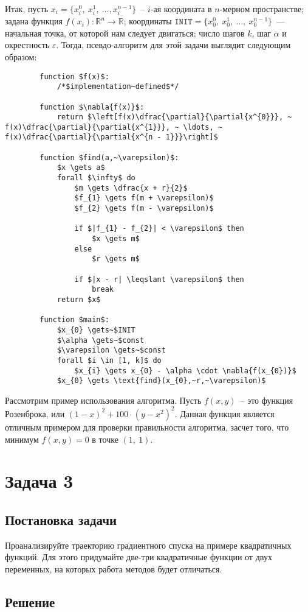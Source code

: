 \documentclass[12pt, a4paper, oneside]{article}
\begin{document}
	Итак, пусть $x_{i} = \{x^{0}_{i}, ~ x^{1}_{i}, ~ \ldots, x^{n - 1}_{i}\}$~-- $i$-ая координата в $n$-мерном пространстве; задана функция $f(x_{i}) : \mathbb{R}^{n} \to \mathbb{R}$; координаты $\texttt{INIT} = \{x^{0}_{0}, ~ x^{1}_{0}, ~ \ldots, ~ x^{n - 1}_{0}\}$~--- начальная точка, от которой нам следует двигаться; число шагов $k$, шаг $\alpha$ и окрестность $\varepsilon$. Тогда, псевдо-алгоритм для этой задачи выглядит следующим образом:
	\begin{lstlisting}
		function $f(x)$:
			/*$implementation~defined$*/
		
		function $\nabla{f(x)}$:
			return $\left[f(x)\dfrac{\partial}{\partial{x^{0}}}, ~ f(x)\dfrac{\partial}{\partial{x^{1}}}, ~ \ldots, ~ f(x)\dfrac{\partial}{\partial{x^{n - 1}}}\right]$

		function $find(a,~\varepsilon)$:
			$x \gets a$
			forall $\infty$ do
				$m \gets \dfrac{x + r}{2}$
				$f_{1} \gets f(m + \varepsilon)$
				$f_{2} \gets f(m - \varepsilon)$

				if $|f_{1} - f_{2}| < \varepsilon$ then
					$x \gets m$
				else
					$r \gets m$

				if $|x - r| \leqslant \varepsilon$ then
					break
			return $x$

		function $main$:
			$x_{0} \gets~$INIT
			$\alpha \gets~$const
			$\varepsilon \gets~$const
			forall $i \in [1, k]$ do
				$x_{i} \gets x_{0} - \alpha \cdot \nabla{f(x_{0})}$
			$x_{0} \gets \text{find}(x_{0},~r,~\varepsilon)$
	\end{lstlisting}
	Рассмотрим пример использования алгоритма. Пусть $f(x, y)$~-- это функция Розенброка, или $(1 - x)^{2} + 100 \cdot (y - x^{2})^{2}$. Данная функция является отличным примером для проверки правильности алгоритма, засчет того, что минимум $f(x, y) = 0$ в точке $(1,~1)$.
	\begin{flushleft}
		
	\end{flushleft}
	\section*{Задача 3}
	\subsection*{Постановка задачи}
	Проанализируйте траекторию градиентного спуска на примере квадратичных функций. Для этого придумайте две-три квадратичные функции от двух переменных, на которых работа методов будет отличаться.
	\subsection*{Решение}
\end{document}
